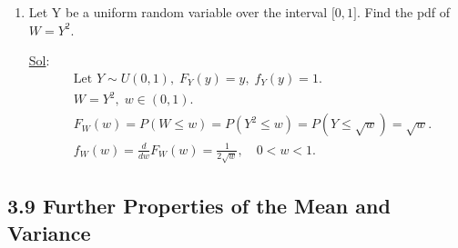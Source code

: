 \begin{enumerate}
	\item[8.] Let Y be a uniform random variable over the interval \(\lbrack 0, 1 \rbrack\). Find the pdf of \(W = Y^2\).

	      \underline{Sol}: \\
	      \[
		      \begin{aligned}
			       & \text{Let } Y\sim U(0,1),\; F_Y(y)=y,\; f_Y(y)=1.          \\
			       & W=Y^2,\; w\in(0,1).                                        \\
			       & F_W(w)=P(W\leq w)=P(Y^2\leq w)=P(Y\leq\sqrt{w})=\sqrt{w}.  \\
			       & f_W(w)=\frac{d}{dw}F_W(w)=\frac{1}{2\sqrt{w}},\quad 0<w<1.
		      \end{aligned}
	      \]
\end{enumerate}

\subsection*{3.9 Further Properties of the Mean and Variance}

